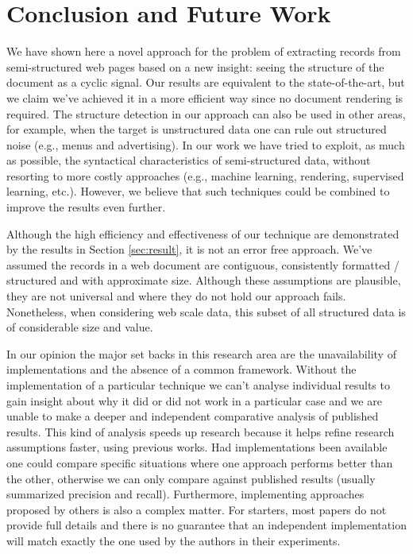 \section{Conclusion and Future Work}\label{sec:con}

We have shown here a novel approach for the problem of extracting records from
semi-structured web pages based on a new insight: seeing the structure of the
document as a cyclic signal. Our results are equivalent to the state-of-the-art,
but we claim we've achieved it in a more efficient way since no document
rendering is required. The structure detection in our approach can also be used
in other areas, for example, when the target is unstructured data one can rule
out structured noise (e.g., menus and advertising). In our work we have tried to
exploit, as much as possible, the syntactical characteristics of semi-structured
data, without resorting to more costly approaches (e.g., machine learning,
rendering, supervised learning, etc.). However, we believe that such techniques
could be combined to improve the results even further. 

Although the high efficiency and effectiveness of our technique are demonstrated
by the results in Section \ref{sec:result}, it is not an error free approach.
We've assumed the records in a web document are contiguous, consistently
formatted / structured and with approximate size. Although these assumptions are
plausible, they are not universal and where they do not hold our approach fails.
Nonetheless, when considering web scale data, this subset of all structured data
is of considerable size and value.

In our opinion the major set backs in this research area are the unavailability
of implementations and the absence of a common framework.
Without the implementation of a particular technique we can't analyse individual
results to gain insight about why it did or did not work in a particular case
and we are unable to make a deeper and independent comparative analysis of
published results. This kind of analysis speeds up research because it helps
refine research assumptions faster, using previous works. Had implementations
been available one could compare specific situations where one approach performs
better than the other, otherwise we can only compare against published results
(usually summarized precision and recall). Furthermore, implementing approaches
proposed by others is also a complex matter. For starters, most papers do not
provide full details and there is no guarantee that an independent
implementation will match exactly the one used by the authors in their
experiments.
 
